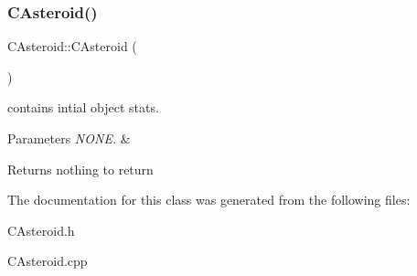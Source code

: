 \subsubsection{\texorpdfstring{C\+Asteroid()}{CAsteroid()}}
{\footnotesize\ttfamily C\+Asteroid\+::\+C\+Asteroid (\begin{DoxyParamCaption}{ }\end{DoxyParamCaption})}



contains intial object stats. 


\begin{DoxyParams}{Parameters}
{\em N\+O\+N\+E.} & \\
\hline
\end{DoxyParams}
\begin{DoxyReturn}{Returns}
nothing to return 
\end{DoxyReturn}


The documentation for this class was generated from the following files\+:\begin{DoxyCompactItemize}
\item 
C\+Asteroid.\+h\item 
C\+Asteroid.\+cpp\end{DoxyCompactItemize}

